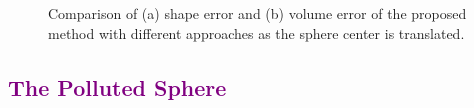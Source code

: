 \begin{figure}[]
	\centering
	\caption{Comparison of (a) shape error and (b) volume error of the proposed method with different approaches as the sphere center is translated.}
	\label{fig:graph3}
\end{figure}
\subsection{\textcolor{purple}{The Polluted Sphere}}
\label{The Polluted Sphere}

